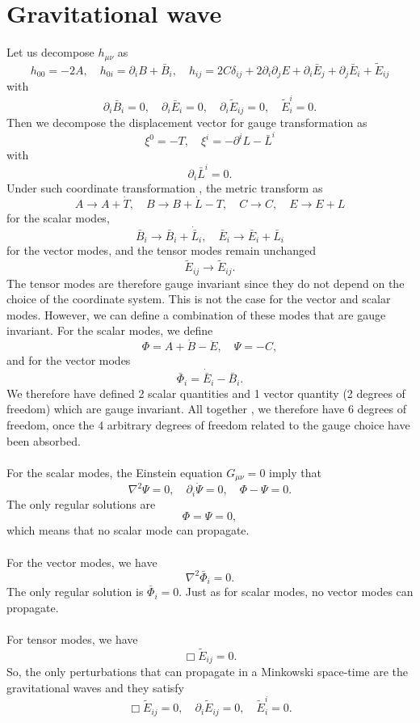 \section{Gravitational wave}
Let us decompose $h_{\mu\nu}$ as
\[h_{00} = -2A , \quad h_{0i} = \partial_i B + \bar{B}_i , \quad h_{ij} = 2C\delta_{ij} + 2\partial_i\partial_j E + \partial _i\bar{E}_j + \partial_j\bar{E}_i + \tilde{E}_{ij} \]
with
\[\partial_i \bar{B}_i = 0 , \quad \partial_i \bar{E}_i = 0 , \quad \partial_i \tilde{E}_{ij} = 0 , \quad \tilde{E}^i_i = 0.\]
Then we decompose the displacement vector for gauge transformation as
\[\xi^0 = -T , \quad \xi^i = -\partial^i L - \bar{L}^i \]
with
\[\partial_i \bar{L}^i = 0.\]
Under such coordinate transformation , the metric transform as
\[A \to A + \dot{T} , \quad B \to B + \dot{L} - T , \quad C \to C , \quad E \to E  + L \]
for the scalar modes,
\[\bar{B}_i \to \bar{B}_i + \dot{\bar{L}}_i , \quad \bar{E}_i \to \bar{E}_i + \bar{L}_i \]
for the vector modes, and the tensor modes remain unchanged
\[\tilde{E}_{ij} \to \tilde{E}_{ij}.\]
The tensor modes are therefore gauge invariant since they do not depend on the choice of the coordinate system. This is not the case for the vector and scalar modes. However, we can define a combination of these modes that are gauge invariant. For the scalar modes, we define
\[\Phi = A + \dot{B} - \ddot{E} , \quad \Psi = -C, \]
and for the vector modes
\[\bar{\Phi}_i = \dot{\bar{E}}_i - \bar{B}_i.\]
We therefore have defined 2 scalar quantities and 1 vector quantity (2 degrees of freedom) which are gauge invariant. All together , we therefore have $6$ degrees of freedom, once the $4$ arbitrary degrees of freedom related to the gauge choice have been absorbed.
\\ \\
For the scalar modes, the Einstein equation $G_{\mu\nu} = 0$ imply that
\[\nabla^2 \Psi = 0 , \quad \partial_i \dot{\Psi} =0 , \quad \Phi-\Psi = 0.\]
The only regular solutions are
\[\Phi = \Psi = 0,\]
which means that no scalar mode can propagate.
\\ \\
For the vector modes, we have
\[\nabla^2 \bar{\Phi}_i = 0.\]
The only regular solution is $\bar{\Phi}_i = 0$. Just as for scalar modes, no vector modes can propagate.
\\ \\
For tensor modes, we have
\[\Box \tilde{E}_{ij} = 0.\]
So, the only perturbations that can propagate in a Minkowski space-time are the gravitational waves and they satisfy
\[\Box \tilde{E}_{ij} = 0 , \quad \partial_i \tilde{E}_{ij} = 0 , \quad \tilde{E}^i_i = 0.\]

